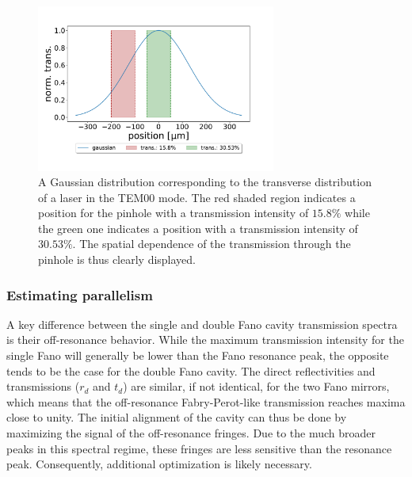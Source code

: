 \begin{figure}[h!]
    \centering
    \includegraphics[width=0.7\textwidth]{figures/pinhole_position_on_gaussian.pdf}
    \caption{A Gaussian distribution corresponding to the transverse distribution of a laser in the TEM00 mode. The red shaded region indicates a position for the pinhole with a transmission intensity of $15.8\%$ while the green one indicates a position with a transmission intensity of $30.53\%$. The spatial dependence of the transmission through the pinhole is thus clearly displayed.}
    \label{fig:pinhole_position_on_gaussian}
\end{figure}

\subsubsection{Estimating parallelism}\label{sec:parallelism}

A key difference between the single and double Fano cavity transmission spectra is their off-resonance behavior. While the maximum transmission intensity for the single Fano will generally be lower than the Fano resonance peak, the opposite tends to be the case for the double Fano cavity. The direct reflectivities and transmissions ($r_d$ and $t_d$) are similar, if not identical, for the two Fano mirrors, which means that the off-resonance Fabry-Perot-like transmission reaches maxima close to unity. The initial alignment of the cavity can thus be done by maximizing the signal of the off-resonance fringes. Due to the much broader peaks in this spectral regime, these fringes are less sensitive than the resonance peak. Consequently, additional optimization is likely necessary. 

